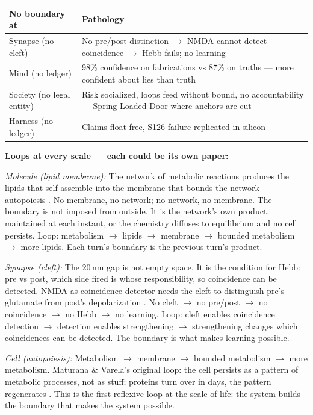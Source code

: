 \documentclass[11pt]{article}
\begin{document}
\begin{center}
\small
\begin{tabular}{p{2.4cm}p{6.0cm}}
\toprule
No boundary at & Pathology \\
\midrule
Synapse (no cleft) & No pre/post distinction $\to$\allowbreak{} NMDA cannot detect coincidence $\to$\allowbreak{} Hebb fails; no learning \\
Mind (no ledger) & 98\% confidence on fabrications vs 87\% on truths --- more confident about lies than truth \citep{gazzaniga2000,johansson2005} \\
Society (no legal entity) & Risk socialized, loops feed without bound, no accountability --- Spring-Loaded Door where anchors are cut \\
Harness (no ledger) & Claims float free, S126 failure replicated in silicon \\
\bottomrule
\end{tabular}
\end{center}


\textbf{Loops at every scale --- each could be its own paper:}

\textit{Molecule (lipid membrane):} The network of metabolic reactions produces the lipids that self-assemble into the membrane that bounds the network --- autopoiesis \citep{maturana1980}. No membrane, no network; no network, no membrane. The boundary is not imposed from outside. It is the network's own product, maintained at each instant, or the chemistry diffuses to equilibrium and no cell persists. Loop: metabolism $\to$\allowbreak{} lipids $\to$\allowbreak{} membrane $\to$\allowbreak{} bounded metabolism $\to$\allowbreak{} more lipids. Each turn's boundary is the previous turn's product.

\textit{Synapse (cleft):} The 20\,nm gap is not empty space. It is the condition for Hebb: pre vs post, which side fired is whose responsibility, so coincidence can be detected. NMDA as coincidence detector needs the cleft to distinguish pre's glutamate from post's depolarization \citep{tononi2014}. No cleft $\to$\allowbreak{} no pre/post $\to$\allowbreak{} no coincidence $\to$\allowbreak{} no Hebb $\to$\allowbreak{} no learning. Loop: cleft enables coincidence detection $\to$\allowbreak{} detection enables strengthening $\to$\allowbreak{} strengthening changes which coincidences can be detected. The boundary is what makes learning possible.

\textit{Cell (autopoiesis):} Metabolism $\to$\allowbreak{} membrane $\to$\allowbreak{} bounded metabolism $\to$\allowbreak{} more metabolism. Maturana \& Varela's original loop: the cell persists as a pattern of metabolic processes, not as stuff; proteins turn over in days, the pattern regenerates \citep{maturana1980}. This is the first reflexive loop at the scale of life: the system builds the boundary that makes the system possible.
\end{document}
